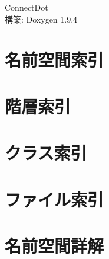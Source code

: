 \documentclass[twoside]{book}
\newcommand{\+}{\discretionary{\mbox{\scriptsize$\hookleftarrow$}}{}{}}
\newcommand{\clearemptydoublepage}{%
    \newpage{\pagestyle{empty}\cleardoublepage}%
  }
\begin{document}
  \raggedbottom
  \begin{CJK}{UTF8}{min}
    \hypersetup{pageanchor=false,
                bookmarksnumbered=true,
                pdfencoding=unicode
               }
  \begin{titlepage}
  \vspace*{7cm}
  \begin{center}%
  {\Large Connect\+Dot}\\
  \vspace*{1cm}
  {\large 構築\+: Doxygen 1.9.4}\\
  \end{center}
  \end{titlepage}
  \clearemptydoublepage
  \tableofcontents
  \clearemptydoublepage
  \hypersetup{pageanchor=true}
\chapter{名前空間索引}

\chapter{階層索引}

\chapter{クラス索引}

\chapter{ファイル索引}

\chapter{名前空間詳解}





\end{CJK}
\end{document}

